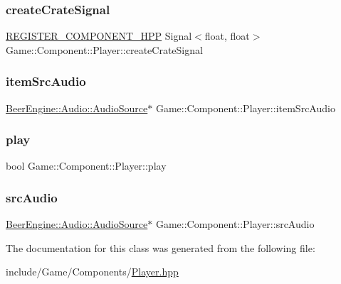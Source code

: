 \subsubsection{\texorpdfstring{create\+Crate\+Signal}{createCrateSignal}}
{\footnotesize\ttfamily \mbox{\hyperlink{_core_8hpp_a895cfc16b36b6c309f80b98ded63df4f}{R\+E\+G\+I\+S\+T\+E\+R\+\_\+\+C\+O\+M\+P\+O\+N\+E\+N\+T\+\_\+\+H\+PP}} Signal$<$float, float$>$ Game\+::\+Component\+::\+Player\+::create\+Crate\+Signal}

\mbox{\label{class_game_1_1_component_1_1_player_ac2b4bb08b1e40f6b0923fa44869a69b7}} 
\subsubsection{\texorpdfstring{item\+Src\+Audio}{itemSrcAudio}}
{\footnotesize\ttfamily \mbox{\hyperlink{class_beer_engine_1_1_audio_1_1_audio_source}{Beer\+Engine\+::\+Audio\+::\+Audio\+Source}}$\ast$ Game\+::\+Component\+::\+Player\+::item\+Src\+Audio}

\mbox{\label{class_game_1_1_component_1_1_player_af1aa4677c3d843f722d502529dbe1192}} 
\subsubsection{\texorpdfstring{play}{play}}
{\footnotesize\ttfamily bool Game\+::\+Component\+::\+Player\+::play}

\mbox{\label{class_game_1_1_component_1_1_player_aa488f4fe911f9532edfb35f72b926f9e}} 
\subsubsection{\texorpdfstring{src\+Audio}{srcAudio}}
{\footnotesize\ttfamily \mbox{\hyperlink{class_beer_engine_1_1_audio_1_1_audio_source}{Beer\+Engine\+::\+Audio\+::\+Audio\+Source}}$\ast$ Game\+::\+Component\+::\+Player\+::src\+Audio}



The documentation for this class was generated from the following file\+:\begin{DoxyCompactItemize}
\item 
include/\+Game/\+Components/\mbox{\hyperlink{_player_8hpp}{Player.\+hpp}}\end{DoxyCompactItemize}
